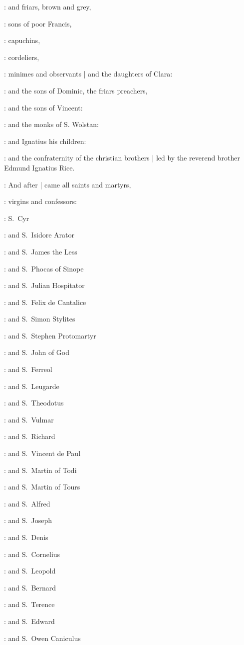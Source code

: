 :
and friars,
brown and grey,

:
sons of poor Francis,

:
capuchins,

:
cordeliers,

:
minimes and observants |
and the daughters of Clara:

:
and the sons of Dominic,
the friars preachers,

:
and the sons of Vincent:

:
and the monks of S. Wolstan:

:
and Ignatius his children:

:
and the confraternity of the christian brothers |
led by the reverend brother Edmund Ignatius Rice.

:
And after |
came all saints and martyrs,

:
virgins and confessors:

:
S.~Cyr

:
and S.~Isidore Arator

:
and S.~James the Less

:
and S.~Phocas of Sinope

:
and S.~Julian Hospitator

:
and S.~Felix de Cantalice

:
and S.~Simon Stylites

:
and S.~Stephen Protomartyr

:
and S.~John of God

:
and S.~Ferreol

:
and S.~Leugarde

:
and S.~Theodotus

:
and S.~Vulmar

:
and S.~Richard

:
and S.~Vincent de Paul

:
and S.~Martin of Todi

:
and S.~Martin of Tours

:
and S.~Alfred

:
and S.~Joseph

:
and S.~Denis

:
and S.~Cornelius

:
and S.~Leopold

:
and S.~Bernard

:
and S.~Terence

:
and S.~Edward

:
and S.~Owen Caniculus

